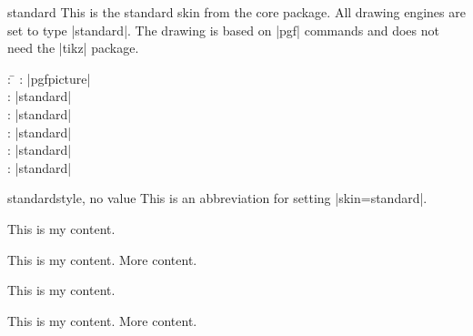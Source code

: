 \begin{docSkin}{standard}
  This is the standard skin from the core package. All drawing engines
  are set to type |standard|. The drawing is based on |pgf| commands and
  does not need the |tikz| package.
\begin{tcolorbox}[skintable=standard]
  \begin{tabbing}
    : \=\kill
    :  \> |pgfpicture|\\ 
    :           \> |standard|\\
    : \> |standard|\\ 
    :        \> |standard|\\
    :    \> |standard|\\
    :           \> |standard|
  \end{tabbing}
\end{tcolorbox}
\end{docSkin}

\begin{docTcbKey}{standard}{}{style, no value}
  This is an abbreviation for setting |skin=standard|.
\end{docTcbKey}

\begin{dispExample}
\begin{tcbraster}[standard,raster equal height,raster columns=4,
    colback=LightGreen,colframe=DarkGreen,colbacktitle=LimeGreen!75!DarkGreen,
    left=1mm,right=1mm,top=1mm,bottom=1mm,middle=1mm]
  \begin{tcolorbox}
    This is my content.
  \end{tcolorbox}
  \begin{tcolorbox}
    This is my content.
    \tcblower
    More content.
  \end{tcolorbox}
  \begin{tcolorbox}[adjusted title=My title]
    This is my content.
  \end{tcolorbox}
  \begin{tcolorbox}[adjusted title=My title]
    This is my content.
    \tcblower
    More content.
  \end{tcolorbox}
\end{tcbraster}
\end{dispExample}


\clearpage

